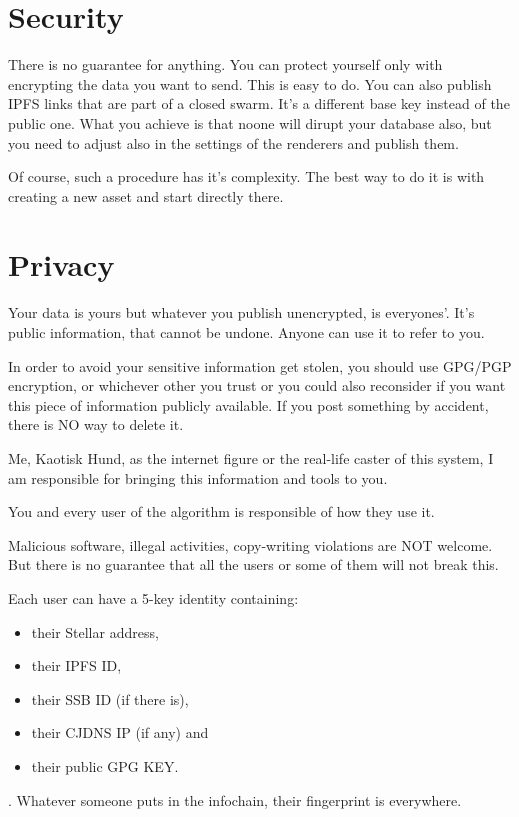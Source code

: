 \documentclass[10pt,a4paper]{paper}
\begin{document}
	\section{Security}\label{security}
	There is no guarantee for anything. You can protect yourself only with encrypting the data you want to send. This is easy to do. You can also publish IPFS links that are part of a closed swarm. It's a different base key instead of the public one. What you achieve is that noone will dirupt your database also, but you need to adjust also in the settings of the renderers and publish them.

	Of course, such a procedure has it's complexity. The best way to do it is with creating a new asset and start directly there.


	\section{Privacy}\label{privacy}

	Your data is yours but whatever you publish unencrypted, is everyones'. It's public information, that cannot be undone. Anyone can use it to refer to you.

	In order to avoid your sensitive information get stolen, you should use GPG/PGP encryption, or whichever other you trust or you could also reconsider if you want this piece of information publicly available. If you post something by accident, there is NO way to delete it.

	Me, Kaotisk Hund, as the internet figure or the real-life caster of this system, I am responsible for bringing this information and tools to you. 
	
	You and every user of the algorithm is responsible of how they use it.

	Malicious software, illegal activities, copy-writing violations are NOT welcome. But there is no guarantee that all the users or some of them will not break this.

	Each user can have a 5-key identity containing: \begin{itemize}
	\item their Stellar address,
	\item their IPFS ID,
	\item their SSB ID (if there is),
	\item their CJDNS IP (if any) and
	\item their public GPG KEY.
	\end{itemize}. Whatever someone puts in the infochain, their fingerprint is everywhere.
	
\end{document}
